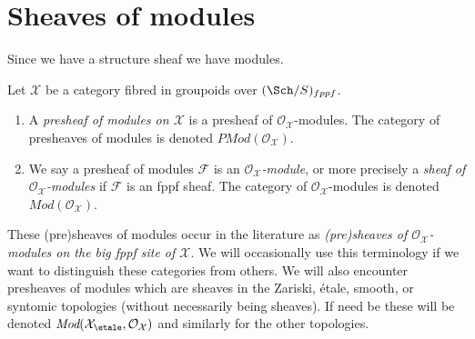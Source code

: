 \section{Sheaves of modules}
\label{section-modules}

\noindent
Since we have a structure sheaf we have modules.

\begin{definition}
\label{definition-modules}
Let $\mathcal{X}$ be a category fibred in groupoids over
$(\Sch/S)_{fppf}$.
\begin{enumerate}
\item A {\it presheaf of modules on $\mathcal{X}$} is a
presheaf of $\mathcal{O}_\mathcal{X}$-modules. The category of
presheaves of modules is denoted $\textit{PMod}(\mathcal{O}_\mathcal{X})$.
\item We say a presheaf of modules $\mathcal{F}$ is an
{\it $\mathcal{O}_\mathcal{X}$-module}, or more precisely a
{\it sheaf of $\mathcal{O}_\mathcal{X}$-modules} if $\mathcal{F}$
is an fppf sheaf. The category of $\mathcal{O}_\mathcal{X}$-modules
is denoted $\textit{Mod}(\mathcal{O}_\mathcal{X})$.
\end{enumerate}
\end{definition}

\noindent
These (pre)sheaves of modules occur in the literature as {\it (pre)sheaves
of $\mathcal{O}_\mathcal{X}$-modules on the big fppf site of $\mathcal{X}$}.
We will occasionally use this terminology if we want to distinguish these
categories from others. We will also encounter presheaves of modules which
are sheaves in the Zariski, \'etale, smooth, or syntomic topologies
(without necessarily being sheaves). If need be these will be denoted
$\textit{Mod}(\mathcal{X}_\etale, \mathcal{O}_\mathcal{X})$
and similarly for the other topologies.

